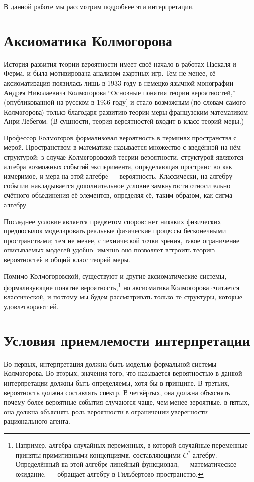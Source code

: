 \documentclass[14pt]{extarticle}
\begin{document}
В данной работе мы рассмотрим подробнее эти интерпретации.

\section{Аксиоматика Колмогорова}

История развития теории вероятности имеет своё начало в работах Паскаля и Ферма, и была мотивирована анализом азартных игр. Тем не менее, её аксиоматизация появилась лишь в 1933 году в немецко-язычной монографии Андрея Николаевича Колмогорова ``Основные понятия теории вероятностей,'' (опубликованной на русском в 1936 году) и стало возможным (по словам самого Колмогорова) только благодаря развитию теории меры французским математиком Анри Лебегом. (В сущности, теория вероятностей входит в класс теорий меры.)

Профессор Колмогоров формализовал вероятность в терминах пространства с мерой. Пространством в математике называется множество с введённой на нём структурой; в случае Колмогоровской теории вероятности, структурой являются алгебра возможных событий эксперимента, определяющая пространство как измеримое, и мера на этой алгебре --- вероятность. Классически, на алгебру событий накладывается дополнительное условие замкнутости относительно счётного объединения её элементов, определяя её, таким образом, как сигма-алгебру.

Последнее условие является предметом споров: нет никаких физических предпосылок моделировать реальные физические процессы бесконечными пространствами; тем не менее, с технической точки зрения, такое ограничение описываемых моделей удобно: именно оно позволяет встроить теорию вероятностей в общий класс теорий меры.

Помимо Колмогоровской, существуют и другие аксиоматические системы, формализующие понятие вероятность,\footnote{Например, алгебра случайных переменных, в которой случайные переменные приняты примитивными концепциями, составляющими $C^*$-алгебру. Определённый на этой алгебре линейный функционал, --- математическое ожидание, --- обращает алгебру в Гильбертово пространство.} но аксиоматика Колмогорова считается классической, и поэтому мы будем рассматривать только те структуры, которые удовлетворяют ей.

\section{Условия приемлемости интерпретации}

Во-первых, интерпретация должна быть моделью формальной системы Колмогорова.
Во-вторых, значения того, что называется вероятностью в данной интерпретации должны быть определяемы, хотя бы в принципе.
В третьих, вероятность должна составлять спектр.
В четвёртых, она должна объяснять почему более вероятные события случаются чаще, чем менее вероятные.
в пятых, она должна объяснять роль вероятности в ограничении уверенности рационального агента.
\end{document}
